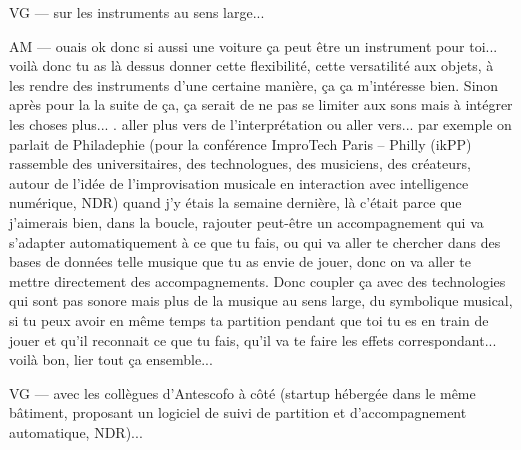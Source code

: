 VG — sur les instruments au sens large... 

AM — ouais ok donc si aussi une voiture ça peut être un instrument pour toi... voilà donc tu as là dessus donner cette flexibilité, cette versatilité aux objets, à les rendre des instruments d'une certaine manière, ça ça m'intéresse bien. Sinon après pour la la suite de ça, ça serait de ne pas se limiter aux sons mais à intégrer les choses plus... . aller plus vers de l'interprétation ou aller vers... par exemple on parlait de Philadephie (pour la conférence ImproTech Paris – Philly (ikPP) rassemble des universitaires, des technologues, des musiciens, des créateurs, autour de l’idée de l’improvisation musicale en interaction avec intelligence numérique, NDR) quand j'y étais la semaine dernière, là c'était parce que j'aimerais bien, dans la boucle, rajouter peut-être un accompagnement qui va s'adapter automatiquement à ce que tu fais, ou qui va aller te chercher dans des bases de données telle musique que tu as envie de jouer, donc on va aller te mettre directement des accompagnements. Donc coupler  ça avec des technologies qui sont pas sonore mais plus de la musique au sens large, du symbolique musical, si tu peux avoir en même temps ta partition pendant que toi tu es en train de jouer et qu'il reconnait ce que tu fais, qu'il va te faire les effets correspondant... voilà bon, lier tout ça ensemble... 

VG — avec les collègues d'Antescofo à côté (startup hébergée dans le même bâtiment, proposant un logiciel de suivi de partition et d'accompagnement automatique, NDR)... 

